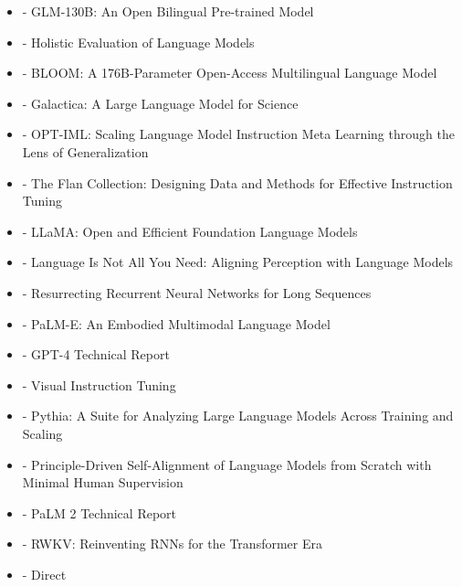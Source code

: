 \documentclass[
  letterpaper,
  DIV=11,
  numbers=noendperiod]{scrartcl}
\begin{document}
\begin{itemize}
\item
  \autocite{zeng2023glm130bopenbilingualpretrained} - GLM-130B: An Open
  Bilingual Pre-trained Model
\item
  \autocite{liang2023holisticevaluationlanguagemodels} - Holistic
  Evaluation of Language Models
\item
  \autocite{workshop2023bloom176bparameteropenaccessmultilingual} -
  BLOOM: A 176B-Parameter Open-Access Multilingual Language Model
\item
  \autocite{taylor2022galacticalargelanguagemodel} - Galactica: A Large
  Language Model for Science
\item
  \autocite{iyer2023optimlscalinglanguagemodel} - OPT-IML: Scaling
  Language Model Instruction Meta Learning through the Lens of
  Generalization
\item
  \autocite{longpre2023flancollectiondesigningdata} - The Flan
  Collection: Designing Data and Methods for Effective Instruction
  Tuning
\item
  \autocite{touvron2023llamaopenefficientfoundation} - LLaMA: Open and
  Efficient Foundation Language Models
\item
  \autocite{huang2023languageneedaligningperception} - Language Is Not
  All You Need: Aligning Perception with Language Models
\item
  \autocite{orvieto2023resurrectingrecurrentneuralnetworks} -
  Resurrecting Recurrent Neural Networks for Long Sequences
\item
  \autocite{driess2023palmeembodiedmultimodallanguage} - PaLM-E: An
  Embodied Multimodal Language Model
\item
  \autocite{openai2024gpt4technicalreport} - GPT-4 Technical Report
\item
  \autocite{liu2023visualinstructiontuning} - Visual Instruction Tuning
\item
  \autocite{biderman2023pythiasuiteanalyzinglarge} - Pythia: A Suite for
  Analyzing Large Language Models Across Training and Scaling
\item
  \autocite{sun2023principledrivenselfalignmentlanguagemodels} -
  Principle-Driven Self-Alignment of Language Models from Scratch with
  Minimal Human Supervision
\item
  \autocite{anil2023palm2technicalreport} - PaLM 2 Technical Report
\item
  \autocite{peng2023rwkvreinventingrnnstransformer} - RWKV: Reinventing
  RNNs for the Transformer Era
\item
  \autocite{rafailov2024directpreferenceoptimizationlanguage} - Direct

\end{itemize}
\end{document}
